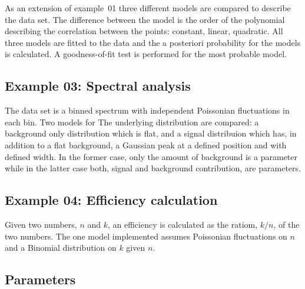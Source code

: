 \documentclass[11pt, a4paper]{article}
\begin{document}
As an extension of example~01 three different models are compared to
describe the data set. The difference between the model is the order
of the polynomial describing the correlation between the points:
constant, linear, quadratic. All three models are fitted to the data
and the a posteriori probability for the models is calculated. A
goodness-of-fit test is performed for the most probable model.


\subsection{Example 03: Spectral analysis} 
\label{section:example03} 

The data set is a binned spectrum with independent Poissonian
fluctuations in each bin. Two models for The underlying distribution
are compared: a background only distribution which is flat, and a
signal distribuion which has, in addition to a flat background, a
Gaussian peak at a defined position and with defined width. In the
former case, only the amount of background is a parameter while in the
latter case both, signal and background contribution, are parameters. 


\subsection{Example 04: Efficiency calculation} 

Given two numbers, $n$ and $k$, an efficiency is calculated as the
ratiom, $k/n$, of the two numbers. The one model implemented assumes
Poissonian fluctuations on $n$ and a Binomial distribution on $k$
given $n$. 


\begin{appendix}

\section{Parameters} 

\end{appendix} 

\end{document}
